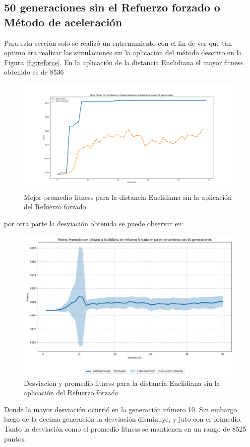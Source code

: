 \documentclass[conference]{IEEEtran}
\begin{document}
\subsection{50 generaciones sin el Refuerzo forzado o Método de aceleración}
Para esta sección solo se realizó un entrenamiento con el fin de ver que tan optimo era realizar las simulaciones sin la aplicación del método descrito en la Figura \ref{fig:reforce}.
En la aplicación de la distancia Euclidiana el mayor fitness obtenido es de 8536
\begin{figure}[H]
    \centering
    \includegraphics[width=0.9\linewidth]{Sin_Refuerzo_50Gen/Eucli_NoRef_50Gen.png}
    \caption{Mejor promedio fitness para la distancia Euclidiana sin la aplicación del Refuerzo forzado}
    \label{fig:no_refoice_eucli}
\end{figure}
por otra parte la desviación obtenida se puede observar en:
\begin{figure}[H]
    \centering
    \includegraphics[width=0.9\linewidth]{Sin_Refuerzo_50Gen/Eucli_NoRef_50Gen_Sombra.png}
    \caption{Desviación y promedio fitness para la distancia Euclidiana sin la aplicación del Refuerzo forzado}
    \label{fig:no_refoice_eucli_desv}
\end{figure}
Donde la mayor desviación ocurrió en la generación número 10. Sin embargo luego de la decima generación la desviación disminuye, y juto con el primedio. Tanto la desviación como el promedio fitness se mantienen en un rango de 8525 puntos.
\end{document}
